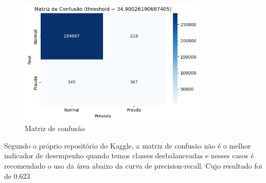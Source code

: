 \documentclass[a4paper,12pt]{article}
\begin{document}
\begin{figure}[H]
    \centering
    \includegraphics[width=0.8\textwidth]{../output/matriz de confusao maximo f1.png}
    \caption{Matriz de confusão}
    \label{fig:matriz_confusao}
\end{figure}
Segundo o próprio repositório do Kaggle, a matriz de confusão não é o melhor indicador de desempenho quando temos classes desbalanceadas e nesses casos é recomendado o uso da área abaixo da curva de precision-recall. Cujo resultado foi de 0.623
\end{document}
